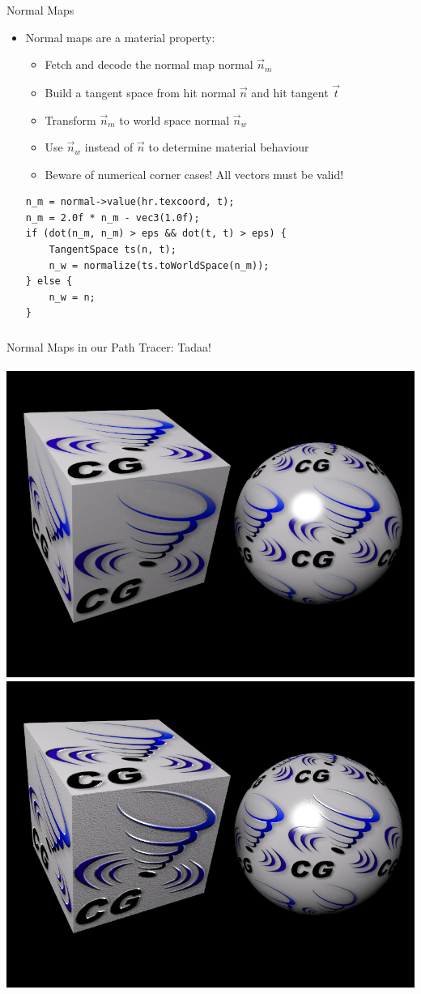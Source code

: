 \documentclass[utf8,stillsansserifmath,fleqn,t]{beamer}
\begin{document}
\begin{frame}[fragile,label=normal-maps-2]
\frametitle{\insertsection}
Normal Maps
\begin{itemize}
\item Normal maps are a material property:
\begin{itemize}
\item Fetch and decode the normal map normal $\vec{n}_m$
\item Build a tangent space from hit normal $\vec{n}$ and hit tangent $\vec{t}$
\item Transform $\vec{n}_m$ to world space normal $\vec{n}_w$
\item Use $\vec{n}_w$ instead of $\vec{n}$ to determine material behaviour
\item Beware of numerical corner cases! All vectors must be valid!
\end{itemize}
\begin{lstlisting}
n_m = normal->value(hr.texcoord, t);
n_m = 2.0f * n_m - vec3(1.0f);
if (dot(n_m, n_m) > eps && dot(t, t) > eps) {
    TangentSpace ts(n, t);
    n_w = normalize(ts.toWorldSpace(n_m));
} else {
    n_w = n;
}
\end{lstlisting}
\end{itemize}
\end{frame}

\begin{frame}
\frametitle{\insertsection}
Normal Maps in our Path Tracer: Tadaa!\\~\\
\includegraphics[width=.495\textwidth]{./fig/normalmap-idea-1.png}\hfill
\includegraphics[width=.495\textwidth]{./fig/normalmap-idea-3.png}
\end{frame}
\end{document}

